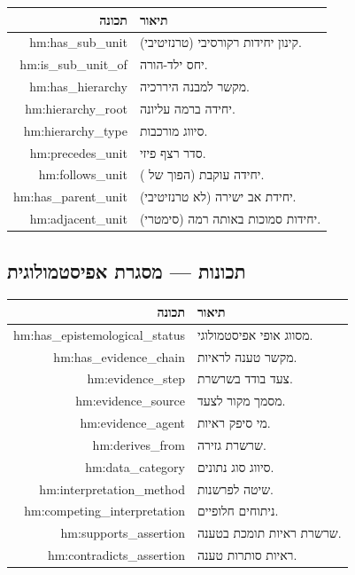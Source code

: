 \documentclass[12pt,a4paper]{article}
\newcommand{\en}[1]{\textenglish{\LR{#1}}}
\newcommand{\new}[1]{\textcolor{newaddition}{#1}}
\newcommand{\newprop}[1]{\textcolor{newaddition}{#1}}
\begin{document}
\begin{longtable}{|r|p{8cm}|}
\hline
\textbf{תכונה} & \textbf{תיאור} \\
\hline
\endhead

\newprop{hm:has\_sub\_unit} & \new{קינון יחידות רקורסיבי (טרנזיטיבי).}\\
\hline
\newprop{hm:is\_sub\_unit\_of} & \new{יחס ילד-הורה.}\\
\hline
\newprop{hm:has\_hierarchy} & \new{מקשר למבנה היררכיה.}\\
\hline
\newprop{hm:hierarchy\_root} & \new{יחידה ברמה עליונה.}\\
\hline
\newprop{hm:hierarchy\_type} & \new{סיווג מורכבות.}\\
\hline
\newprop{hm:precedes\_unit} & \new{סדר רצף פיזי.}\\
\hline

\newprop{hm:follows\_unit} & \new{יחידה עוקבת (הפוך של \en{precedes\_unit}).}\\
\hline

\newprop{hm:has\_parent\_unit} & \new{יחידת אב ישירה (לא טרנזיטיבי).}\\
\hline

\newprop{hm:adjacent\_unit} & \new{יחידות סמוכות באותה רמה (סימטרי).}\\
\hline
\end{longtable}

\subsection{\new{תכונות   — מסגרת אפיסטמולוגית}}

\begin{longtable}{|r|p{8cm}|}
\hline
\textbf{תכונה} & \textbf{תיאור} \\
\hline
\endhead

\newprop{hm:has\_epistemological\_status} & \new{מסווג אופי אפיסטמולוגי.}\\
\hline
\newprop{hm:has\_evidence\_chain} & \new{מקשר טענה לראיות.}\\
\hline
\newprop{hm:evidence\_step} & \new{צעד בודד בשרשרת.}\\
\hline
\newprop{hm:evidence\_source} & \new{מסמך מקור לצעד.}\\
\hline
\newprop{hm:evidence\_agent} & \new{מי סיפק ראיות.}\\
\hline
\newprop{hm:derives\_from} & \new{שרשרת גזירה.}\\
\hline
\newprop{hm:data\_category} & \new{סיווג סוג נתונים.}\\
\hline
\newprop{hm:interpretation\_method} & \new{שיטה לפרשנות.}\\
\hline
\newprop{hm:competing\_interpretation} & \new{ניתוחים חלופיים.}\\
\hline

\newprop{hm:supports\_assertion} & \new{שרשרת ראיות תומכת בטענה.}\\
\hline

\newprop{hm:contradicts\_assertion} & \new{ראיות סותרות טענה.}\\
\hline
\end{longtable}
\end{document}
